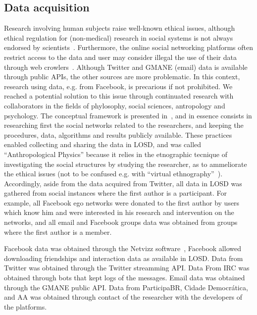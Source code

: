 \documentclass[data,datadescriptor,submit,moreauthors,pdftex]{Definitions/mdpi}
\begin{document}
\subsection{Data acquisition}\label{acq}
Research involving human subjects raise well-known ethical issues,
although ethical regulation for (non-medical) research in social systems is not always endorsed by scientists~\cite{eth}.
Furthermore, the online social networking platforms often restrict access
to the data and user may consider illegal the use of their data through web crowlers~\cite{ile1,ile2,ile3}.
Although Twitter and GMANE (email) data is available through public APIs,
the other sources are more problematic.
In this context, research using data, e.g. from Facebook, is precarious
if not prohibited.
We reached a potential solution to this issue through continuated research with
collaborators in the fields of phylosophy, social sciences, antropology and psychology.
The conceptual framework is presented in~\cite{antphy,antphy2}, and in essence
consists in researching first the social networks related to the researchers,
and keeping the procedures, data, algorithms and results publicly available.
These practices enabled collecting and sharing the data in LOSD,
and was called ``Anthropological Physics'' because it relies in the
etnographic tecnique of investigating the social structures
by studying the researcher, as to ammeliorate the ethical issues
(not to be confused e.g. with ``virtual ethnography''~\cite{veth}).
Accordingly, aside from the data acquired from Twitter, all data in LOSD
was gathered from social instances where the first author is a participant.
For example, all Facebook ego networks were donated to the first author by
users which know him and were interested in his research and intervention on the networks,
and all email and Facebook groups data was obtained from groups where the first author is a member.

Facebook data was obtained through the Netvizz software~\cite{netviz},
Facebook allowed downloading friendships and interaction data as available in LOSD.
Data from Twitter was obtained through the Twitter streamming API.
Data From IRC was obtained through bots that kept logs of the messages.
Email data was obtained through the GMANE public API.
Data from ParticipaBR, Cidade Democrática, and AA was obtained through contact
of the researcher with the developers of the platforms.
\end{document}
